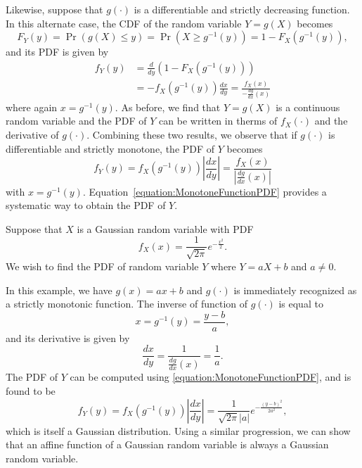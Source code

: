 Likewise, suppose that $g(\cdot)$ is a differentiable and strictly decreasing function.
In this alternate case, the CDF of the random variable $Y = g(X)$ becomes
\begin{equation*}
F_Y(y) = \Pr (g(X) \leq y)
= \Pr \left( X \geq g^{-1}(y) \right)
= 1 - F_X \left( g^{-1} (y) \right) ,
\end{equation*}
and its PDF is given by
\begin{equation*}
\begin{split}
f_Y (y) &= \frac{d}{dy} \left( 1 - F_X \left( g^{-1} (y) \right) \right) \\
&= - f_X \left( g^{-1} (y) \right) \frac{dx}{dy}
= \frac{f_X (x)}{- \frac{dg}{dx}(x)}
\end{split}
\end{equation*}
where again $x = g^{-1} (y)$.
As before, we find that $Y = g(X)$ is a continuous random variable and the PDF of $Y$ can be written in therms of $f_X( \cdot)$ and the derivative of $g(\cdot)$.
Combining these two results, we observe that if $g(\cdot)$ is differentiable and strictly monotone, the PDF of $Y$ becomes
\begin{equation} \label{equation:MonotoneFunctionPDF}
f_Y (y) = f_X \left( g^{-1} (y) \right) \left| \frac{dx}{dy} \right|
= \frac{f_X (x)}{\left| \frac{dg}{dx}(x) \right|}
\end{equation}
with $x = g^{-1}(y)$.
Equation~\eqref{equation:MonotoneFunctionPDF} provides a systematic way to obtain the PDF of $Y$.

\begin{example}
Suppose that $X$ is a Gaussian random variable with PDF
\begin{equation*}
f_X(x) = \frac{1}{\sqrt{2 \pi}} e^{- \frac{x^2}{2}} .
\end{equation*}
We wish to find the PDF of random variable $Y$ where $Y = a X + b$ and $a \neq 0$.

In this example, we have $g(x) = ax + b$ and $g(\cdot)$ is immediately recognized as a strictly monotonic function.
The inverse of function of $g(\cdot)$ is equal to
\begin{equation*}
x = g^{-1} (y) = \frac{y - b}{a} ,
\end{equation*}
and its derivative is given by
\begin{equation*}
\frac{dx}{dy} = \frac{1}{\frac{dg}{dx} (x)} = \frac{1}{a} .
\end{equation*}
The PDF of $Y$ can be computed using \eqref{equation:MonotoneFunctionPDF}, and is found to be
\begin{equation*}
f_Y(y) = f_X \left( g^{-1} (y) \right) \left| \frac{dx}{dy} \right|
= \frac{1}{\sqrt{2 \pi} |a|} e^{- \frac{(y-b)^2}{2 a^2} } ,
\end{equation*}
which is itself a Gaussian distribution.
Using a similar progression, we can show that an affine function of a Gaussian random variable is always a Gaussian random variable.
\end{example}

